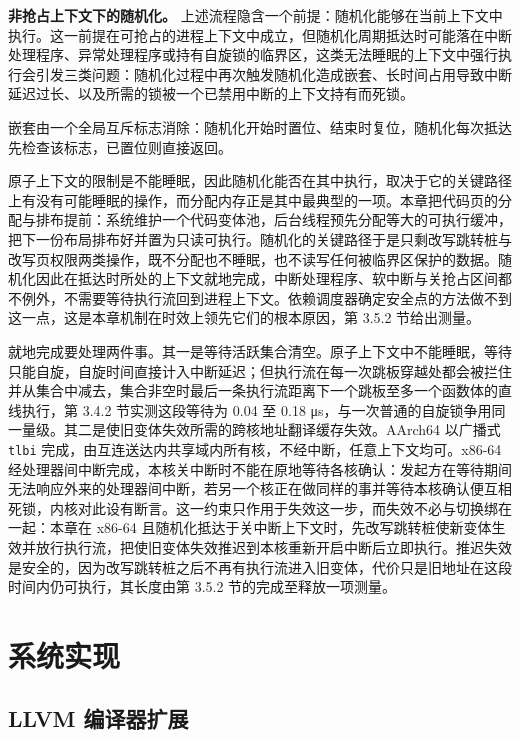 \textbf{非抢占上下文下的随机化。} 上述流程隐含一个前提：随机化能够在当前上下文中执行。这一前提在可抢占的进程上下文中成立，但随机化周期抵达时可能落在中断处理程序、异常处理程序或持有自旋锁的临界区，这类无法睡眠的上下文中强行执行会引发三类问题：随机化过程中再次触发随机化造成嵌套、长时间占用导致中断延迟过长、以及所需的锁被一个已禁用中断的上下文持有而死锁。

嵌套由一个全局互斥标志消除：随机化开始时置位、结束时复位，随机化每次抵达先检查该标志，已置位则直接返回。

原子上下文的限制是不能睡眠，因此随机化能否在其中执行，取决于它的关键路径上有没有可能睡眠的操作，而分配内存正是其中最典型的一项。本章把代码页的分配与排布提前：系统维护一个代码变体池，后台线程预先分配等大的可执行缓冲，把下一份布局排布好并置为只读可执行。随机化的关键路径于是只剩改写跳转桩与改写页权限两类操作，既不分配也不睡眠，也不读写任何被临界区保护的数据。随机化因此在抵达时所处的上下文就地完成，中断处理程序、软中断与关抢占区间都不例外，不需要等待执行流回到进程上下文。依赖调度器确定安全点的方法做不到这一点，这是本章机制在时效上领先它们的根本原因，第 3.5.2 节给出测量。

就地完成要处理两件事。其一是等待活跃集合清空。原子上下文中不能睡眠，等待只能自旋，自旋时间直接计入中断延迟；但执行流在每一次跳板穿越处都会被拦住并从集合中减去，集合非空时最后一条执行流距离下一个跳板至多一个函数体的直线执行，第 3.4.2 节实测这段等待为 0.04 至 0.18 μs，与一次普通的自旋锁争用同一量级。其二是使旧变体失效所需的跨核地址翻译缓存失效。AArch64 以广播式 \lstinline[breaklines=false]@tlbi@ 完成，由互连送达内共享域内所有核，不经中断，任意上下文均可。x86-64 经处理器间中断完成，本核关中断时不能在原地等待各核确认：发起方在等待期间无法响应外来的处理器间中断，若另一个核正在做同样的事并等待本核确认便互相死锁，内核对此设有断言。这一约束只作用于失效这一步，而失效不必与切换绑在一起：本章在 x86-64 且随机化抵达于关中断上下文时，先改写跳转桩使新变体生效并放行执行流，把使旧变体失效推迟到本核重新开启中断后立即执行。推迟失效是安全的，因为改写跳转桩之后不再有执行流进入旧变体，代价只是旧地址在这段时间内仍可执行，其长度由第 3.5.2 节的完成至释放一项测量。

\section{系统实现}

\subsection{LLVM 编译器扩展}

